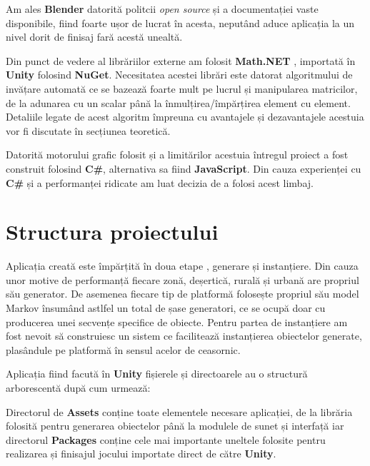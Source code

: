 Am ales \textbf{Blender} datorită politcii \textit{open source} și a documentației vaste disponibile, fiind foarte ușor de lucrat în acesta, neputând aduce aplicația la un nivel dorit de finisaj fară acestă unealtă.\par

Din punct de vedere al librăriilor externe am folosit \textbf{Math.NET} , importată în \textbf{Unity} folosind \textbf{NuGet}. Necesitatea acestei librări este datorat algoritmului de invățare automată ce se bazează foarte mult pe lucrul și manipularea matricilor, de la adunarea cu un scalar până la înmulțirea/împărțirea element cu element. Detaliile legate de acest algoritm împreuna cu avantajele și dezavantajele acestuia vor fi discutate în secțiunea teoretică.\par

Datorită motorului grafic folosit și a limitărilor acestuia întregul proiect a fost construit folosind \textbf{C\#}, alternativa sa fiind \textbf{JavaScript}. Din cauza experienței cu \textbf{C\#} și a performanței ridicate am luat decizia de a folosi acest limbaj.\par

\section{Structura proiectului}

Aplicația creată este împărțită în doua etape , generare și instanțiere. Din cauza unor motive de performanță fiecare zonă, deșertică, rurală și urbană are propriul său generator. De asemenea fiecare tip de platformă folosește propriul său model Markov însumând astlfel un total de șase generatori, ce se ocupă doar cu producerea unei secvențe specifice de obiecte. Pentru partea de instanțiere am fost nevoit să construiesc un sistem ce facilitează instanțierea obiectelor generate, plasândule pe platformă în sensul acelor de ceasornic.\par

Aplicația fiind facută în \textbf{Unity} fișierele și directoarele au o structură arborescentă după cum urmează: \par

\par
Directorul de \textbf{Assets} conține toate elementele necesare aplicației, de la librăria folosită pentru generarea obiectelor până la modulele de sunet și interfață iar directorul \textbf{Packages} conține cele mai importante uneltele folosite pentru realizarea și finisajul jocului importate direct de către \textbf{Unity}.\par


